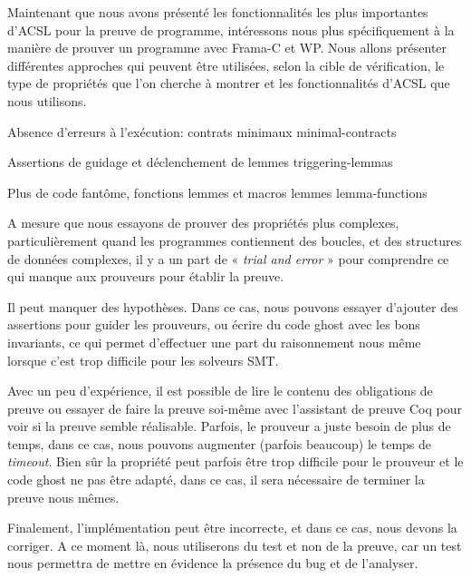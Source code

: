 Maintenant que  nous avons présenté les fonctionnalités les plus importantes
d'ACSL pour la preuve de programme, intéressons nous plus spécifiquement à la
manière de prouver un programme avec Frama-C et WP. Nous allons présenter
différentes approches qui peuvent être utilisées, selon la cible de vérification,
le type de propriétés que l'on cherche à montrer et les fonctionnalités d'ACSL
que nous utilisons.


\begin{levelTwo}
  {Absence d'erreurs à l'exécution: contrats minimaux}
  {minimal-contracts}
\end{levelTwo}

\begin{levelTwo}
  {Assertions de guidage et déclenchement de lemmes}
  {triggering-lemmas}
\end{levelTwo}

\begin{levelTwo}
  {Plus de code fantôme, fonctions lemmes et macros lemmes}
  {lemma-functions}
\end{levelTwo}



\horizontalLine
\newpage


A mesure que nous essayons de prouver des propriétés plus complexes,
particulièrement quand les programmes contiennent des boucles, et des
structures de données complexes, il y a un part de « \textit{trial and error} »
pour comprendre ce qui manque aux prouveurs pour établir la preuve.


Il peut manquer des hypothèses. Dans ce cas, nous pouvons essayer d'ajouter
des assertions pour guider les prouveurs, ou écrire du code ghost avec les
bons invariants, ce qui permet d'effectuer une part du raisonnement nous
même lorsque c'est trop difficile pour les solveurs SMT.


Avec un peu d'expérience, il est possible de lire le contenu des
obligations de preuve ou essayer de faire la preuve soi-même avec
l'assistant de preuve Coq pour voir si la preuve semble réalisable.
Parfois, le prouveur a juste besoin de plus de temps, dans ce cas, nous
pouvons augmenter (parfois beaucoup) le temps de \textit{timeout}. Bien
sûr la propriété peut parfois être trop difficile pour le prouveur et
le code ghost ne pas être adapté, dans ce cas, il sera nécessaire de
terminer la preuve nous mêmes.


Finalement, l'implémentation peut être incorrecte, et dans ce cas,
nous devons la corriger. A ce moment là, nous utiliserons du test et
non de la preuve, car un test nous permettra de mettre en évidence la
présence du bug et de l'analyser.
